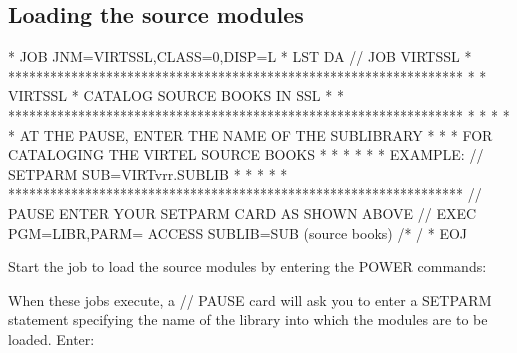 \documentclass[letterpaper,10pt,english]{sphinxmanual}
\begin{document}
\subsection{Loading the source modules}
\label{\detokenize{Installation_Guide:loading-the-source-modules}}
\begin{sphinxVerbatim}[commandchars=\\\{\}]
* \PYGZdl{}\PYGZdl{} JOB JNM=VIRTSSL,CLASS=0,DISP=L
* \PYGZdl{}\PYGZdl{} LST DA
// JOB VIRTSSL
* *****************************************************************
* * VIRTSSL * CATALOG SOURCE BOOKS IN SSL                         *
* *****************************************************************
* *                                                               *
* * AT THE PAUSE, ENTER THE NAME OF THE SUB\PYGZhy{}LIBRARY               *
* * FOR CATALOGING THE VIRTEL SOURCE BOOKS                        *
* *                                                               *
* * EXAMPLE: // SETPARM SUB=\PYGZsq{}VIRTvrr.SUBLIB\PYGZsq{}                      *
* *                                                               *
* *****************************************************************
// PAUSE ENTER YOUR SETPARM CARD AS SHOWN ABOVE
// EXEC PGM=LIBR,PARM=\PYGZsq{} ACCESS SUBLIB=\PYGZam{}SUB\PYGZsq{}
        (source books)
/*
/\PYGZam{}
* \PYGZdl{}\PYGZdl{} EOJ
\end{sphinxVerbatim}

\sphinxAtStartPar
{}

\sphinxAtStartPar
Start the job to load the source modules by entering the POWER commands:

\begin{sphinxVerbatim}[commandchars=\\\{\}]
 
 
 
 
\end{sphinxVerbatim}

\sphinxAtStartPar
When these jobs execute, a // PAUSE card will ask you to enter a SETPARM statement specifying the name of the library into which the modules are to be loaded. Enter:

\begin{sphinxVerbatim}[commandchars=\\\{\}]
  
\end{sphinxVerbatim}
\end{document}
